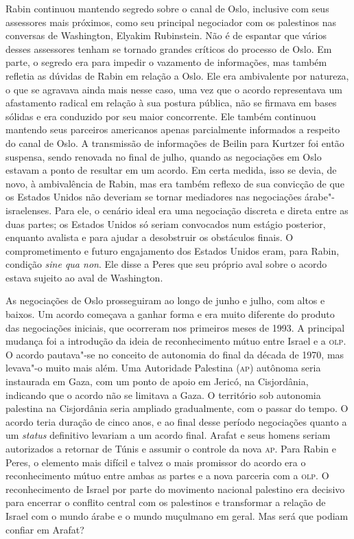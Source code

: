 Rabin continuou mantendo segredo sobre o canal de Oslo, inclusive com
seus assessores mais próximos, como seu principal negociador com os
palestinos nas conversas de Washington, Elyakim Rubinstein. Não é de
espantar que vários desses assessores tenham se tornado grandes críticos
do processo de Oslo. Em parte, o segredo era para impedir o vazamento de
informações, mas também refletia as dúvidas de Rabin em relação a Oslo.
Ele era ambivalente por natureza, o que se agravava ainda mais nesse
caso, uma vez que o acordo representava um afastamento radical em
relação à sua postura pública, não se firmava em bases sólidas e era
conduzido por seu maior concorrente. Ele também continuou mantendo seus
parceiros americanos apenas parcialmente informados a respeito do canal
de Oslo. A transmissão de informações de Beilin para Kurtzer foi então
suspensa, sendo renovada no final de julho, quando as negociações em
Oslo estavam a ponto de resultar em um acordo. Em certa medida, isso se
devia, de novo, à ambivalência de Rabin, mas era também reflexo de sua
convicção de que os Estados Unidos não deveriam se tornar mediadores nas
negociações árabe"-israelenses. Para ele, o cenário ideal era uma
negociação discreta e direta entre as duas partes; os Estados Unidos só
seriam convocados num estágio posterior, enquanto avalista e para
ajudar a desobstruir os obstáculos finais. O comprometimento e futuro
engajamento dos Estados Unidos eram, para Rabin, condição \emph{sine qua
non}. Ele disse a Peres que seu próprio aval sobre o acordo estava
sujeito ao aval de Washington.

As negociações de Oslo prosseguiram ao longo de junho e julho, com altos
e baixos. Um acordo começava a ganhar forma e era muito diferente do
produto das negociações iniciais, que ocorreram nos primeiros meses de
1993. A principal mudança foi a introdução da ideia de reconhecimento
mútuo entre Israel e a \textsc{olp}. O acordo pautava"-se no conceito de autonomia
do final da década de 1970, mas levava"-o muito mais além. Uma Autoridade
Palestina (\textsc{ap}) autônoma seria instaurada em Gaza, com um ponto de apoio
em Jericó, na Cisjordânia, indicando que o acordo não se limitava a
Gaza. O território sob autonomia palestina na Cisjordânia seria ampliado
gradualmente, com o passar do tempo. O acordo teria duração de cinco
anos, e ao final desse período negociações quanto a um \emph{status} definitivo
levariam a um acordo final. Arafat e seus homens seriam autorizados a
retornar de Túnis e assumir o controle da nova \textsc{ap}. Para Rabin e Peres, o
elemento mais difícil e talvez o mais promissor do acordo era o
reconhecimento mútuo entre ambas as partes e a nova parceria com a \textsc{olp}.
O reconhecimento de Israel por parte do movimento nacional palestino era
decisivo para encerrar o conflito central com os palestinos e
transformar a relação de Israel com o mundo árabe e o mundo muçulmano em
geral. Mas será que podiam confiar em Arafat?

